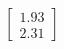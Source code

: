 \documentclass[preview]{standalone}
\begin{document}
\begin{align*}
\begin{bmatrix} 1.93 \\ 2.31 \end{bmatrix}
\end{align*}
\end{document}
